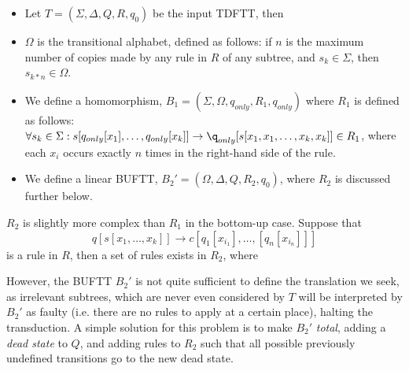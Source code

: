 \begin{itemize}
\item Let $T = (\Sigma, \Delta, Q, R, q_0)$ be the input TDFTT, then

\item $\Omega$ is the transitional alphabet, defined as follows: if $n$ is
the maximum number of copies made by any rule in $R$ of any subtree, and 
$s_k \in \Sigma$, then $s_{k*n} \in \Omega$.

\item We define a homomorphism, $B_1 = (\Sigma, \Omega, q_{only}, R_1, q_{only})$
where $R_1$ is defined as follows: $\forall s_k \in \Sigma:
s[q_{only}[x_1],\ldots,q_{only}[x_k]] \rightarrow
\q_{only}[s[x_1,x_1,\ldots,x_k,x_k]] \in R_1$, where each $x_i$ occurs
exactly $n$ times in the right-hand side of the rule.

\item We define a linear BUFTT, $B_2' = (\Omega, \Delta, Q, R_2, q_0)$,
	where $R_2$ is discussed further below.
\end{itemize}

$R_2$ is slightly more complex than $R_1$ in the bottom-up case. Suppose
that $$q[s[x_1,\ldots,x_k]] \rightarrow c[q_1[x_i_1],\ldots,[q_n[x_i_n]]]$$
is a rule in $R$, then a set of rules exists in $R_2$, where 

However, the BUFTT $B_2'$ is not quite sufficient to define the translation
we seek, as irrelevant subtrees, which are never even considered by $T$
will be interpreted by $B_2'$ as faulty (i.e. there are no rules to apply
at a certain place), halting the transduction. A simple solution for this
problem is to make $B_2'$ \emph{total}, adding a \emph{dead state} to $Q$,
and adding rules to $R_2$ such that all possible previously undefined
transitions go to the new dead state.


